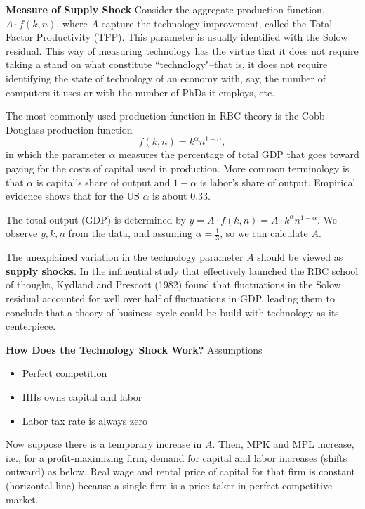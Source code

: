 \documentclass[10pt]{article}
\begin{document}
{\textbf {Measure of Supply Shock}}
Consider the aggregate production function, $ A \cdot f(k, n) $, where $ A $ capture the 
technology improvement, called the Total Factor Productivity (TFP). This parameter is usually
identified with the Solow residual. This way of measuring technology has the virtue that it does not
require taking a stand on what constitute ``technology"--that is, it does not require identifying
the state of technology of an economy with, say, the number of computers it uses or with the number
of PhDs it employs, etc.

The most commonly-used production function in RBC theory is the Cobb-Douglass production function
\begin{equation*}
f(k,n) = k ^{\alpha} n^{1 - \alpha},
\end{equation*}
in which the parameter $ \alpha $ measures the percentage of total GDP that goes toward paying for
the costs of capital used in production. More common terminology is that $ \alpha $ is capital's
share of output and $ 1 - \alpha $ is labor's share of output. Empirical evidence shows that
for the US $ \alpha $ is about 0.33.

The total output (GDP) is determined by $ y = A \cdot f(k,n) = A \cdot k ^{\alpha} n^{1 - \alpha}$.
We observe $ y, k, n $ from the data, and assuming $ \alpha = \frac{1}{3} $, so we can calculate
$ A $.

The unexplained variation in the technology parameter $ A $ should be viewed as {\textbf {supply shocks}}.
In the influential study that effectively launched the RBC school of thought, Kydland and Prescott
(1982) found that fluctuations in the Solow residual accounted for well over half of fluctuations
in GDP, leading them to conclude that a theory of business cycle could be build with technology
as its centerpiece.


{\textbf {How Does the Technology Shock Work?}}
Assumptions
\begin{itemize}
\item Perfect competition
\item HHs owns capital and labor
\item Labor tax rate is always zero
\end{itemize}

Now suppose there is a temporary increase in $ A $.
Then, MPK and MPL increase, i.e., for a profit-maximizing firm, demand for capital and labor 
increases (shifts outward) as below. Real wage and rental price of capital for that firm is constant (horizontal
line) because a single firm is a price-taker in perfect competitive market.
\end{document}
